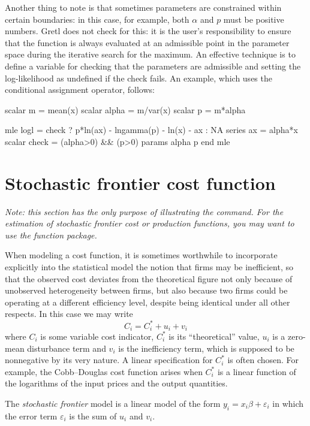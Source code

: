 Another thing to note is that sometimes parameters are constrained
within certain boundaries: in this case, for example, both $\alpha$
and $p$ must be positive numbers. Gretl does not check for this:
it is the user's responsibility to ensure that the function is
always evaluated at an admissible point in the parameter space during
the iterative search for the maximum. An effective technique is to
define a variable for checking that the parameters are admissible and
setting the log-likelihood as undefined if the check fails. An
example, which uses the conditional assignment operator, follows:
\begin{code}
scalar m = mean(x)
scalar alpha = m/var(x)
scalar p = m*alpha

mle logl = check ? p*ln(ax) - lngamma(p) - ln(x) - ax : NA
  series ax = alpha*x
  scalar check = (alpha>0) && (p>0)
  params alpha p
end mle 
\end{code}

\section{Stochastic frontier cost function}
\label{sec:frontier}

\emph{%
Note: this section has the only purpose of illustrating the 
command. For the estimation of stochastic frontier cost or production
functions, you may want to use the  function package.}

When modeling a cost function, it is sometimes worthwhile to
incorporate explicitly into the statistical model the notion that
firms may be inefficient, so that the observed cost deviates from the
theoretical figure not only because of unobserved heterogeneity
between firms, but also because two firms could be operating at a
different efficiency level, despite being identical under all other
respects. In this case we may write
\[
  C_i = C^*_i + u_i + v_i
\]
where $C_i$ is some variable cost indicator, $C_i^*$ is its
``theoretical'' value, $u_i$ is a zero-mean disturbance term and $v_i$
is the inefficiency term, which is supposed to be nonnegative by its
very nature. A linear specification for $C_i^*$ is often chosen. For
example, the Cobb--Douglas cost function arises when $C_i^*$ is a
linear function of the logarithms of the input prices and the output
quantities.

The \emph{stochastic frontier} model is a linear model of the form
$y_i = x_i \beta + \varepsilon_i$ in which the error term
$\varepsilon_i$ is the sum of $u_i$ and $v_i$.  

